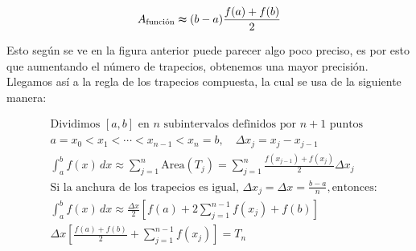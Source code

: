 \documentclass[12pt]{article}
\begin{document}
\begin{equation}\label{eq2}
A_{\text {función}} \thickapprox (b-a)\frac{f(a) + f(b)}{2}
\end{equation}


Esto según se ve en la figura anterior puede parecer algo poco preciso, es por esto que aumentando el número de trapecios, obtenemos una mayor precisión. Llegamos así a la regla de los trapecios compuesta, la cual se usa de la siguiente manera:

    \begin{align*}
        &\text{Dividimos } [a,b] \text{ en } n \text{ subintervalos definidos por } n + 1 \text{ puntos} \\
        &a =x_0 < x_1 < \cdots < x_{n-1} < x_n = b , \quad \Delta x_j =x_j - x_{j-1} \\
        &\int_{a}^{b} f (x)\,dx \approx \sum_{j=1}^{n} \text{Area}(T_j) =\sum_{j=1}^{n}
          \frac{f (x_{j-1}) + f (x_j)}{2} \Delta x_j \\
        &\text{Si la anchura de los trapecios es igual, } \Delta x_j = \Delta x = \frac{b - a}{n} ,\text{entonces:} \\
        &\int_{a}^{b} f (x)\,dx \approx \frac{\Delta x}{2}\left[f(a)+2\sum_{j=1}^{n-1}f(x_j)+f(b)  \right] \\
        &\Delta x \left[ \frac{f(a)+f(b)}{2} + \sum_{j=1}^{n-1} f (x_j)  \right] = T_n
        \end{align*}
\end{document}
